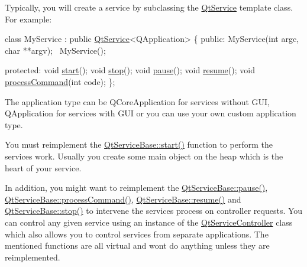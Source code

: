 Typically, you will create a service by subclassing the \hyperlink{class_qt_service}{Qt\+Service} template class. For example\+:


\begin{DoxyCode}
\textcolor{keyword}{class }MyService : \textcolor{keyword}{public} \hyperlink{class_qt_service}{QtService}<QApplication>
\{
\textcolor{keyword}{public}:
    MyService(\textcolor{keywordtype}{int} argc, \textcolor{keywordtype}{char} **argv);
    ~MyService();

\textcolor{keyword}{protected}:
    \textcolor{keywordtype}{void} \hyperlink{class_qt_service_base_adbc0cd621b41bd3a6a1f62fda432e9e4}{start}();
    \textcolor{keywordtype}{void} \hyperlink{class_qt_service_base_a8d52c1b8fd06b50bdc0a0c6f9936a68e}{stop}();
    \textcolor{keywordtype}{void} \hyperlink{class_qt_service_base_a43215a7c5c047d30bcf4f697e6691f89}{pause}();
    \textcolor{keywordtype}{void} \hyperlink{class_qt_service_base_aaa2e05ef1c36283b6b35348c3972b489}{resume}();
    \textcolor{keywordtype}{void} \hyperlink{class_qt_service_base_a47485f00f6eba0758d2ffc75092295cf}{processCommand}(\textcolor{keywordtype}{int} code);
\};
\end{DoxyCode}


The application type can be Q\+Core\+Application for services without G\+UI, Q\+Application for services with G\+UI or you can use your own custom application type.

You must reimplement the \hyperlink{class_qt_service_base_adbc0cd621b41bd3a6a1f62fda432e9e4}{Qt\+Service\+Base\+::start()} function to perform the service\textquotesingle{}s work. Usually you create some main object on the heap which is the heart of your service.

In addition, you might want to reimplement the \hyperlink{class_qt_service_base_a43215a7c5c047d30bcf4f697e6691f89}{Qt\+Service\+Base\+::pause()}, \hyperlink{class_qt_service_base_a47485f00f6eba0758d2ffc75092295cf}{Qt\+Service\+Base\+::process\+Command()}, \hyperlink{class_qt_service_base_aaa2e05ef1c36283b6b35348c3972b489}{Qt\+Service\+Base\+::resume()} and \hyperlink{class_qt_service_base_a8d52c1b8fd06b50bdc0a0c6f9936a68e}{Qt\+Service\+Base\+::stop()} to intervene the service\textquotesingle{}s process on controller requests. You can control any given service using an instance of the \hyperlink{class_qt_service_controller}{Qt\+Service\+Controller} class which also allows you to control services from separate applications. The mentioned functions are all virtual and won\textquotesingle{}t do anything unless they are reimplemented.

